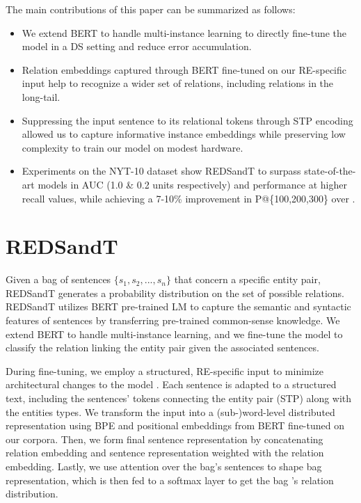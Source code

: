 \documentclass[11pt,a4paper]{article}
\begin{document}
The main contributions of this paper can be summarized as follows:
\begin{itemize}[noitemsep,nolistsep]
    \item We extend BERT to handle multi-instance learning to directly fine-tune the model in a DS setting and reduce error accumulation.
    \item Relation embeddings captured through BERT fine-tuned on our RE-specific input help to recognize a wider set of relations, including relations in the long-tail.
    \item Suppressing the input sentence to its relational tokens through STP encoding allowed us to capture informative instance embeddings while preserving low complexity to train our model on modest hardware.
    \item Experiments on the NYT-10 dataset show REDSandT to surpass state-of-the-art models \cite{Vashishth2018, Alt2019} in AUC (1.0 \& 0.2 units respectively) and performance at higher recall values, while achieving a 7-10\% improvement in P@\{100,200,300\} over \cite{Alt2019}.
\end{itemize}



\section{REDSandT}
\label{sect:redsandt}
Given a bag of sentences $\{s_1, s_2, ..., s_n\}$ that concern a specific entity pair, REDSandT generates a probability distribution on the set of possible relations. REDSandT utilizes BERT pre-trained LM to capture the semantic and syntactic features of sentences by transferring pre-trained common-sense knowledge. We extend BERT to handle multi-instance learning, and we fine-tune the model to classify the relation linking the entity pair given the associated sentences. 

During fine-tuning, we employ a structured, RE-specific input to minimize architectural changes to the model \cite{Radford2018}. Each sentence is adapted to a structured text, including the sentences' tokens connecting the entity pair (STP) along with the entities types. We transform the input into a (sub-)word-level distributed representation using BPE and positional embeddings from BERT fine-tuned on our corpora. Then, we form final sentence representation by concatenating relation embedding and sentence representation weighted with the relation embedding. Lastly, we use attention over the bag's sentences to shape bag representation, which is then fed to a softmax layer to get the bag 's relation distribution. 
\end{document}
